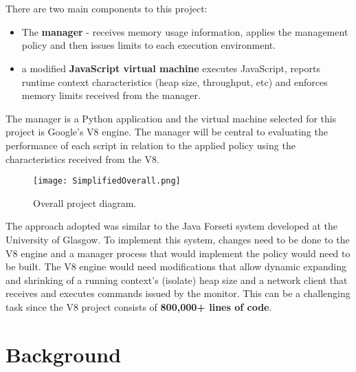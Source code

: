 \documentclass{l4proj}
\begin{document}
\\\\
There are two main components to this project:
\begin{itemize}
\item The \textbf{manager} - receives memory usage information, applies the management policy and then issues limits to each execution environment.
\item a modified \textbf{JavaScript virtual machine} executes JavaScript, reports runtime context characteristics (heap size, throughput, etc) and enforces memory limits received from the manager.
\end{itemize}
The manager is a Python application and the virtual machine selected for this project is Google's V8 engine. The manager will be central to evaluating the performance of each script in relation to the applied policy using the characteristics received from the V8.

\begin{figure}[!ht]
  \centering
    \texttt{[image: SimplifiedOverall.png]}
    \caption{Overall project diagram.}
\end{figure}

The approach adopted was similar to the Java Forseti system developed at the University of Glasgow\cite{forseti}. To implement this system, changes need to be done to the V8 engine and a manager process that would implement the policy would need to be built. The V8 engine would need modifications that allow dynamic expanding and shrinking of a running context's (isolate) heap size and a network client that receives and executes commands issued by the monitor. This can be a challenging task since the V8 project consists of \textbf{800,000+ lines of code}. %

\chapter{Background}
\end{document}
